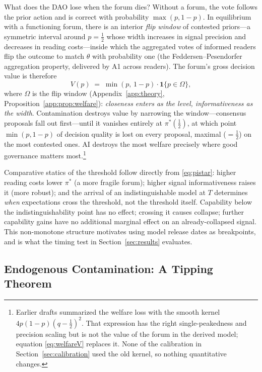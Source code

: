 \documentclass[12pt]{article}
\begin{document}
What does the DAO lose when the forum dies? Without a forum, the vote follows the prior action and is correct with probability $\max(p, 1-p)$. In equilibrium with a functioning forum, there is an interior \emph{flip window} of contested priors---a symmetric interval around $p = \tfrac12$ whose width increases in signal precision and decreases in reading costs---inside which the aggregated votes of informed readers flip the outcome to match $\theta$ with probability one (the Feddersen--Pesendorfer aggregation property, delivered by A1 across readers). The forum's gross decision value is therefore
\begin{equation}
  V(p) \;=\; \min(p,\,1-p) \cdot \mathbf{1}\{p \in \Omega\},
  \label{eq:welfareV}
\end{equation}
where $\Omega$ is the flip window (Appendix~\ref{app:theory}, Proposition~\ref{app:prop:welfare}): \emph{closeness enters as the level, informativeness as the width}. Contamination destroys value by narrowing the window---consensus proposals fall out first---until it vanishes entirely at $\pi^*(\tfrac12)$, at which point $\min(p,1-p)$ of decision quality is lost on every proposal, maximal ($=\tfrac12$) on the most contested ones. AI destroys the most welfare precisely where good governance matters most.\footnote{Earlier drafts summarized the welfare loss with the smooth kernel $4p(1-p)(q-\tfrac12)^2$. That expression has the right single-peakedness and precision scaling but is not the value of the forum in the derived model; equation \eqref{eq:welfareV} replaces it. None of the calibration in Section~\ref{sec:calibration} used the old kernel, so nothing quantitative changes.}

Comparative statics of the threshold follow directly from \eqref{eq:pistar}: higher reading costs lower $\pi^*$ (a more fragile forum); higher signal informativeness raises it (more robust); and the arrival of an indistinguishable model at $T$ determines \emph{when} expectations cross the threshold, not the threshold itself. Capability below the indistinguishability point has no effect; crossing it causes collapse; further capability gains have no additional marginal effect on an already-collapsed signal. This non-monotone structure motivates using model release dates as breakpoints, and is what the timing test in Section~\ref{sec:results} evaluates.

\subsection{Endogenous Contamination: A Tipping Theorem}
\label{sec:tippingmodel}
\end{document}
